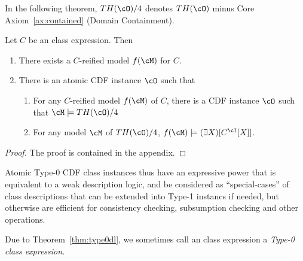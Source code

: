 In the following theorem, $TH(\cO)/4$ denotes $TH(\cO)$ minus Core
Axiom~\ref{ax:contained} (Domain Containment).  
\begin{theorem} \label{thm:type0dl}
Let $C$ be an \omsdl{} class expression.  Then 
\begin{enumerate}
\item There exists a $C$-reified model $f(\cM)$ for $C$.  
\item There is an atomic CDF instance $\cO$ such that 
\begin{enumerate}
\item For any $C$-reified model $f(\cM)$ of $C$, there is a CDF instance
$\cO$ such that $\cM \models TH(\cO)/4$
\item For any model $\cM$ of $TH(\cO)/4$, $f(\cM) \models (\exists X)
				[C^{\cI}[X]] $.
\end{enumerate}
\end{enumerate}
\end{theorem}
\begin{proof}
The proof is contained in the appendix.
\end{proof}

Atomic Type-0 CDF class instances thus have an expressive power that
is equivalent to a weak description logic, and be considered as
``special-cases'' of class descriptions that can be extended into
Type-1 instancs if needed, but otherwise are efficient for consistency
checking, subsumption checking and other operations.  

Due to Theorem~\ref{thm:type0dl}, we sometimes call an \omsdl{} class
expression a {\em Type-0 class expression}.

